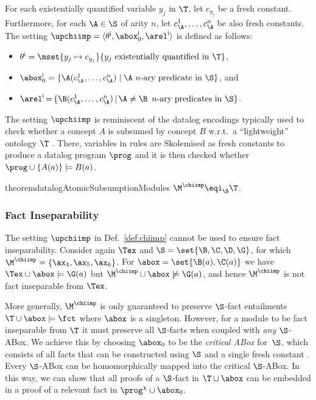 \begin{definition} \label{def:chiimp} %
For each existentially quantified variable $y_j$ in $\T$, let $c_{y_j}$
be a fresh constant. Furthermore, 
for each $\A\in\S$ of arity $n$, let $c_{\A}^1, \ldots, c_{\A}^n$ be 
also fresh constants.  The setting
  $\upchiimp=\langle \theta^{\mathsf{i}}, \abox_0^{\mathsf{i}}, \arel^{\mathsf{i}} \rangle$  is defined as follows:
  \begin{itemize}
  \item $\theta^{\mathsf{i}}=\mset{y_j\mapsto c_{y_j}}{y_j \text{ existentially quantified in }
      \T}$,
  \item $\abox_0^{\mathsf{i}}=\{\A(c_{\A}^1, \ldots, c_{\A}^n) \mid \A \text{~$n$-ary predicate in } \S\}$, and
  \item $\arel^{\mathsf{i}}\,{=}\,\{\B(c_{\A}^1, \ldots, c_{\A}^n)\,{\mid}\,
    \A \neq \B\, \text{~$n$-ary predicates in } \S \}$.\qedhere 
  \end{itemize}  
\end{definition}
%
%
The setting
$\upchiimp$ is reminiscent of the datalog encodings 
typically used  to check whether a
concept  $A$ is subsumed by concept $B$
w.r.t.\  a  ``lightweight'' 
ontology $\T$ \cite{DBLP:conf/semweb/KrotzschRH08,stefanoni2013introducing}.
There, variables in rules are Skolemised as
fresh constants to produce a datalog program $\prog$
and it is then checked whether $\prog \cup \{A(a)\} \models B(a)$.
 
\begin{restatable}{theorem}{datalogAtomicSubsumptionModules}
\label{thm:datalogAtomicSubsumptionModules}
$\M^{\chiimp}\eqi_{\S} \T$.  
\end{restatable} 
 

\subsubsection{Fact Inseparability}

The setting $\upchiimp$ in
Def.~\ref{def:chiimp} cannot be used to ensure fact inseparability.
Consider again $\Tex$ and $\S = \set{\B,\C, \D,\G}$, for which
$\M^{\chiimp} = \{\ax_4, \ax_5, \ax_6\}$. For $\abox =
\set{\B(a),\C(a)}$ we have $\Tex \cup \abox \models \G(a)$ but
$\M^{\chiimp} \cup \abox \not\models \G(a)$, and hence $\M^{\chiimp}$
is not fact inseparable from $\Tex$.

More generally, 
$\M^{\chiimp}$ is only guaranteed to preserve
$\S$-fact entailments \mbox{$\T\cup\abox\models\fct$} where 
$\abox$ is a singleton. However, for a module to be fact inseparable
from $\T$ it must preserve all $\S$-facts when coupled with
\emph{any} $\S$-ABox.   
 We achieve this by choosing 
 $\abox_0$ to be the \emph{critical ABox}
for~$\S$, which consists of all facts that can be
constructed using $\S$ and a single fresh constant
\cite{DBLP:conf/pods/Marnette09}. Every $\S$-ABox
can be homomorphically mapped into the critical
$\S$-ABox. 
In this way, we can show
that all proofs of a $\S$-fact in $\T \cup \abox$ can 
be embedded in a proof of a relevant fact in $\prog^{\chi} \cup \abox_0$.



